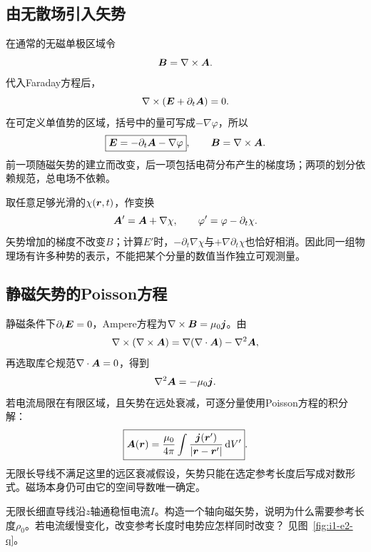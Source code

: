 \subsection{由无散场引入矢势}
在通常的无磁单极区域令
\[\bm{B}=\nabla\times\bm{A}.
\]
代入Faraday方程后，
\[\nabla\times(\bm{E}+\partial_t\bm{A})=0.
\]
在可定义单值势的区域，括号中的量可写成$-\nabla\varphi$，所以
\begin{equation}\label{eq:i1-potentials}
\boxed{\bm{E}=-\partial_t\bm{A}-\nabla\varphi},\qquad
\bm{B}=\nabla\times\bm{A}.
\end{equation}
前一项随磁矢势的建立而改变，后一项包括电荷分布产生的梯度场；两项的划分依赖规范，总电场不依赖。

取任意足够光滑的$\chi(\bm{r},t)$，作变换
\[\bm{A}'=\bm{A}+\nabla\chi,\qquad
\varphi'=\varphi-\partial_t\chi.
\]
矢势增加的梯度不改变$B$；计算$E'$时，$-\partial_t\nabla\chi$与$+\nabla\partial_t\chi$也恰好相消。因此同一组物理场有许多种势的表示，不能把某个分量的数值当作独立可观测量。

\subsection{静磁矢势的Poisson方程}
静磁条件下$\partial_t\bm{E}=0$，Ampere方程为$\nabla\times\bm{B}=\mu_0\bm{j}$。由
\[\nabla\times(\nabla\times\bm{A})
=\nabla(\nabla\cdot\bm{A})-\nabla^2\bm{A},
\]
再选取库仑规范$\nabla\cdot\bm{A}=0$，得到
\[\nabla^2\bm{A}=-\mu_0\bm{j}.
\]
若电流局限在有限区域，且矢势在远处衰减，可逐分量使用Poisson方程的积分解：
\[\boxed{\bm{A}(\bm{r})=\frac{\mu_0}{4\pi}
\int\frac{\bm{j}(\bm{r}')}{|\bm{r}-\bm{r}'|}\mathop{}\!\mathrm d V'}.
\]
无限长导线不满足这里的远区衰减假设，矢势只能在选定参考长度后写成对数形式。磁场本身仍可由它的空间导数唯一确定。


\begin{example}[无限直电流的磁矢势与参考长度]\label{ex:i1-e2}
无限长细直导线沿$z$轴通稳恒电流$I$。构造一个轴向磁矢势，说明为什么需要参考长度$\rho_0$。若电流缓慢变化，改变参考长度时电势应怎样同时改变？ 见图~\ref{fig:i1-e2-q}。
\end{example}

